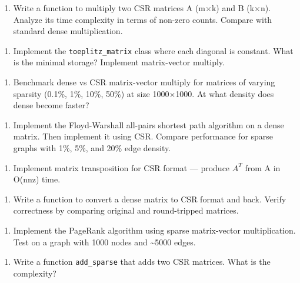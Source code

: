 \begin{enumerate}
\item Write a function to multiply two CSR matrices A (m$\times $k) and B (k$\times $n). Analyze its time complexity in terms of non-zero counts. Compare with standard dense multiplication.
\end{enumerate}

\begin{enumerate}
\item Implement the \texttt{toeplitz\_matrix} class where each diagonal is constant. What is the minimal storage? Implement matrix-vector multiply.
\end{enumerate}

\begin{enumerate}
\item Benchmark dense vs CSR matrix-vector multiply for matrices of varying sparsity (0.1\%, 1\%, 10\%, 50\%) at size 1000$\times $1000. At what density does dense become faster?
\end{enumerate}

\begin{enumerate}
\item Implement the Floyd-Warshall all-pairs shortest path algorithm on a dense matrix. Then implement it using CSR. Compare performance for sparse graphs with 1\%, 5\%, and 20\% edge density.
\end{enumerate}

\begin{enumerate}
\item Implement matrix transposition for CSR format — produce $A^{T}$ from A in O(nnz) time.
\end{enumerate}

\begin{enumerate}
\item Write a function to convert a dense matrix to CSR format and back. Verify correctness by comparing original and round-tripped matrices.
\end{enumerate}

\begin{enumerate}
\item Implement the PageRank algorithm using sparse matrix-vector multiplication. Test on a graph with 1000 nodes and \textasciitilde{}5000 edges.
\end{enumerate}

\begin{enumerate}
\item Write a function \texttt{add\_sparse} that adds two CSR matrices. What is the complexity?
\end{enumerate}

